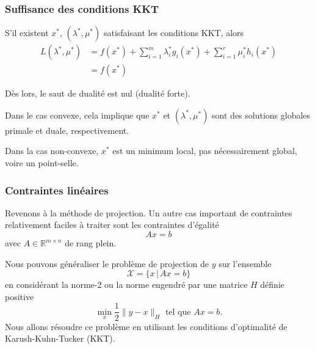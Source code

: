\documentclass[usepdftitle=false]{beamer}
\def\red{\color{red}}
\def\cL{\mathcal{L}}
\def\cX{\mathcal{X}}
\def\RR{\mathbb{R}}
\begin{document}
\begin{frame}
	\frametitle{Suffisance des conditions KKT}
	
	S'il existent $x^*$, $(\lambda^*, \mu^*)$ satisfaisant les conditions KKT, alors
	\begin{align*}
	L(\lambda^*, \mu^*) &= f(x^*) + \sum_{i = 1}^m \lambda_i^* g_i(x^*) + \sum_{i = 1}^r \mu_i^* h_i(x^*) \\
	&= f(x^*)
	\end{align*}
	
	Dès lors, le saut de dualité est nul ({\red dualité forte}).
	
	\mbox{}
	
	Dans le cas convexe, cela implique que 	$x^*$ et $(\lambda^*, \mu^*)$ sont des solutions globales primale et duale, respectivement.

	\mbox{}

	Dans la cas non-convexe, $x^*$ est un minimum local, pas nécessairement global, voire un point-selle.
	
	
\end{frame}

\begin{frame}
	\frametitle{Contraintes linéaires}
	
	Revenons à la méthode de projection.
	Un autre cas important de contraintes relativement faciles à traiter sont les contraintes d'égalité
	$$
	Ax = b
	$$
	avec $A \in \RR^{m \times n}$ de rang plein.
	
	Nous pouvons généraliser le problème de projection de $y$ sur l'ensemble
	$$
	\cX = \lbrace x \,|\, Ax = b \rbrace
	$$
	en considérant la norme-2 ou la norme engendré par une matrice $H$ définie positive
	$$
	\min_x \frac{1}{2} \| y - x \|_H \mbox{ tel que } Ax = b.
	$$
	Nous allons résoudre ce problème en utilisant les conditions d'optimalité de Karush-Kuhn-Tucker (KKT).
	
\end{frame}
\end{document}
